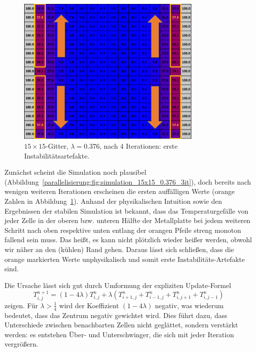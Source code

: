 \begin{figure}[htbp]
	\centering
	\includegraphics[width=0.8\textwidth]{papers/parallelisierung/images/simulation_15x15_0.376_4it.pdf}
	\caption{\(15\times 15\)-Gitter, \(\lambda = 0.376\), nach 4 Iterationen: erste Instabilitätsartefakte.}
	\label{parallelisierung:fig:simulation_15x15_0.376_4it}
\end{figure}

Zunächst scheint die Simulation noch plausibel (Abbildung~\ref{parallelisierung:fig:simulation_15x15_0.376_3it}), doch bereits nach wenigen weiteren Iterationen erscheinen die ersten auffälligen Werte (orange Zahlen in Abbildung~\ref{parallelisierung:fig:simulation_15x15_0.376_4it}). Anhand der physikalischen Intuition sowie den Ergebnissen der stabilen Simulation ist bekannt, dass das Temperaturgefälle von jeder Zelle in der oberen bzw. unteren Hälfte der Metallplatte bei jedem weiteren Schritt nach oben respektive unten entlang der orangen Pfeile streng monoton fallend sein muss. Das heißt, es kann nicht plötzlich wieder heißer werden, obwohl wir näher an den (kühlen) Rand gehen. Daraus lässt sich schließen, dass die orange markierten Werte unphysikalisch und somit erste Instabilitäts-Artefakte sind.


Die Ursache lässt sich gut durch Umformung der expliziten Update-Formel 
\begin{equation}
	T_{i,j}^{n+1}
	=
	(1-4\lambda)T_{i,j}^n +
	\lambda \left(
	T_{i+1,j}^n + T_{i-1,j}^n + T_{i,j+1}^n + T_{i,j-1}^n
	\right)
\end{equation}
zeigen.
Für \(\lambda > \tfrac14\) wird der Koeffizient \((1-4\lambda)\) negativ, was wiederum bedeutet, dass das Zentrum negativ gewichtet wird.  
Dies führt dazu, dass Unterschiede zwischen benachbarten Zellen nicht geglättet, sondern verstärkt werden: es entstehen Über- und Unterschwinger, die sich mit jeder Iteration vergrößern.

